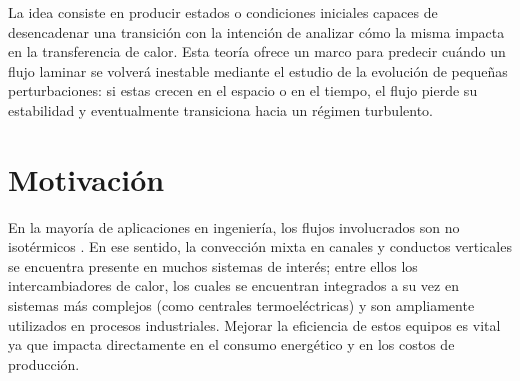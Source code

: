La idea consiste en producir estados o condiciones iniciales capaces de desencadenar una transición con la intención de analizar cómo la misma impacta en la transferencia de calor. Esta teoría ofrece un marco para predecir cuándo un flujo laminar se volverá inestable mediante el estudio de la evolución de pequeñas perturbaciones: si estas crecen en el espacio o en el tiempo, el flujo pierde su estabilidad y eventualmente transiciona hacia un régimen turbulento.


\section{Motivación}




En la mayoría de aplicaciones en ingeniería, los flujos involucrados son no isotérmicos \cite{chen2003direct}. En ese sentido, la convección mixta en canales y conductos verticales se encuentra presente en muchos sistemas de interés; entre ellos los intercambiadores de calor, los cuales se encuentran integrados a su vez en sistemas más complejos (como centrales termoeléctricas) y son ampliamente utilizados en procesos industriales. Mejorar la eficiencia de estos equipos es vital ya que impacta directamente en el consumo energético y en los costos de producción. %

